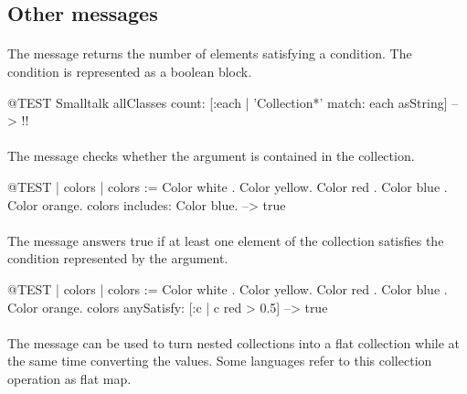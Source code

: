\documentclass[a4paper,10pt,twoside]{book}
\begin{document}
\subsection{Other messages}

\paragraph{}
The message  returns the number of elements satisfying a condition.
The condition is represented as a boolean block.

\begin{code}{@TEST}
Smalltalk allClasses count: [:each | 'Collection*' match: each asString] --> !!
\end{code}

\paragraph{}
The message  checks whether the argument is contained in the collection. 

\begin{code}{@TEST | colors |}
colors := {Color white . Color yellow. Color red . Color blue . Color orange}.
colors includes: Color blue. --> true
\end{code}

\paragraph{}
The message  answers true if at least one element of the collection satisfies the condition represented by the argument.

\begin{code}{@TEST | colors | colors := {Color white . Color yellow. Color red . Color blue . Color orange}.}
colors anySatisfy: [:c | c red > 0.5] --> true
\end{code}

\paragraph{}
The message  can be used to turn nested collections into a flat collection while at the same time converting the values. Some languages refer to this collection operation as flat map.
\end{document}
